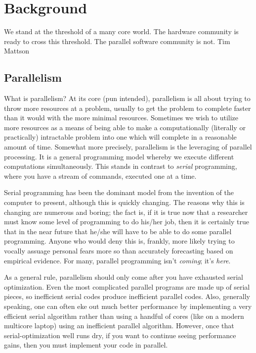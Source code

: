 \chapter{Background}
\label{sec:bg}


\inspire%
{We stand at the threshold of a many core world. The hardware community is ready to cross this 
threshold. The parallel software community is not.}%
{Tim Mattson}


\section{Parallelism}
What is parallelism? At its core (pun intended), parallelism is all about
trying to throw more resources at a problem, usually to get the problem to
complete faster than it would with the more minimal resources. Sometimes
we wish to utilize more resources as a means of being able to make a
computationally (literally or practically) intractable problem into one which
will complete in a reasonable amount of time. Somewhat more precisely,
parallelism is the leveraging of parallel processing. It is a general
programming model whereby we execute different computations simultaneously.
This stands in contrast to \emph{serial} programming, where you have a stream
of commands, executed one at a time.

Serial programming has been the dominant model from the invention of the
computer to present, although this is quickly changing. The reasons why
this is changing are numerous and boring; the fact is, if it is true now
that a researcher must know some level of programming to do his/her job,
then it is certainly true that in the near future that he/she will have to
be able to do some parallel programming. Anyone who would deny this is,
frankly, more likely trying to vocally assuage personal fears more so than
accurately forecasting based on empirical evidence. For many, parallel
programming isn't \emph{coming}; it's \emph{here}.  

As a general rule, parallelism should only come after you have exhausted
serial optimization. Even the most complicated parallel programs are made
up of serial pieces, so inefficient serial codes produce inefficient parallel
codes. Also, generally speaking, one can often eke out much better performance
by implementing a very efficient serial algorithm rather than using a handful
of cores (like on a modern multicore laptop) using an inefficient parallel
algorithm. However, once that serial-optimization well runs dry, if you want
to continue seeing performance gains, then you must implement your code in
parallel.  

